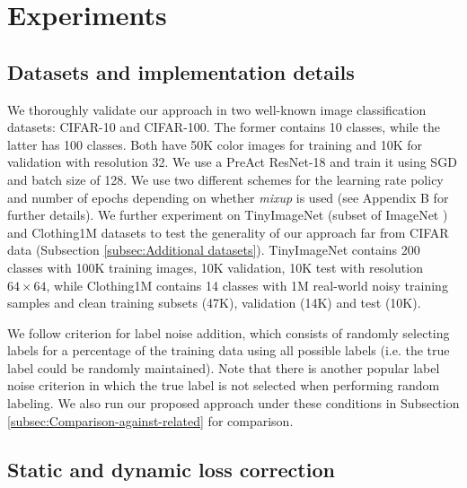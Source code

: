 \documentclass{article}
\begin{document}
\section{Experiments}


\subsection{Datasets and implementation details\label{subsec:Datasets-and-implementation}}



We thoroughly validate our approach in two well-known image classification datasets:
CIFAR-10 and CIFAR-100. The former contains 10 classes, while the
latter has 100 classes. Both have 50K color images for training
and 10K for validation with resolution 32. We use a PreAct
ResNet-18 \cite{2016_ECCV_PreActResNet} and train it using SGD and batch size of
128. We use two different schemes for the learning rate policy and number of epochs depending on whether \emph{mixup} is used (see Appendix B for further details). We further experiment on TinyImageNet (subset of ImageNet
\cite{2009_CVPR_ImageNet}) and Clothing1M \cite{2015_CVPR_GraphModelNoise}
 datasets to test the generality of our approach far from CIFAR data
(Subsection \ref{subsec:Additional datasets}). TinyImageNet contains
200 classes with 100K training images, 10K  validation, 
10K test with resolution $64\times64$, while Clothing1M contains
14 classes with 1M real-world noisy training samples and clean training subsets (47K), validation (14K) and test (10K).
 

We follow \cite{2017_ICLR_Rethinking,2018_ICLR_mixup,2018_CVPR_JointOpt}
criterion for label noise addition, which consists of randomly selecting
labels for a percentage of the training data using all possible labels
(i.e. the true label could be randomly maintained). Note that there
is another popular label noise criterion \cite{2018_ICML_MentorNet,2018_CVPR_IterativeNoise}
in which the true label is not selected when performing random labeling.
We also run our proposed approach under these conditions in Subsection
\ref{subsec:Comparison-against-related} for comparison.

\subsection{Static and dynamic loss correction\label{subsec:Static-vs-Dynamic Boot}}
\end{document}
